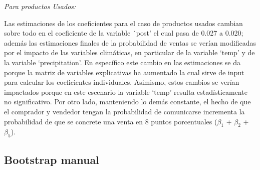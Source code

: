 \documentclass[
  12pt]{article}
\begin{document}
\emph{Para productos Usados:}

Las estimaciones de los coeficientes para el caso de productos usados cambian sobre todo en el coeficiente de la variable ´post' el cual pasa de 0.027 a 0.020; además las estimaciones finales de la probabilidad de ventas se verían modificadas por el impacto de las variables climáticas, en particular de la variable `temp' y de la variable `precipitation'. En específico este cambio en las estimaciones se da porque la matriz de variables explicativas ha aumentado la cual sirve de input para calcular los coeficientes individuales. Asimismo, estos cambios se verían impactados porque en este escenario la variable `temp' resulta estadísticamente no significativo.
Por otro lado, manteniendo lo demás constante, el hecho de que el comprador y vendedor tengan la probabilidad de comunicarse incrementa la probabilidad de que se concrete una venta en 8 puntos porcentuales (\(\beta_1\) + \(\beta_2\) + \(\beta_5\)).

\hypertarget{bootstrap-manual}{%
\subsection{Bootstrap manual}\label{bootstrap-manual}}
\end{document}
